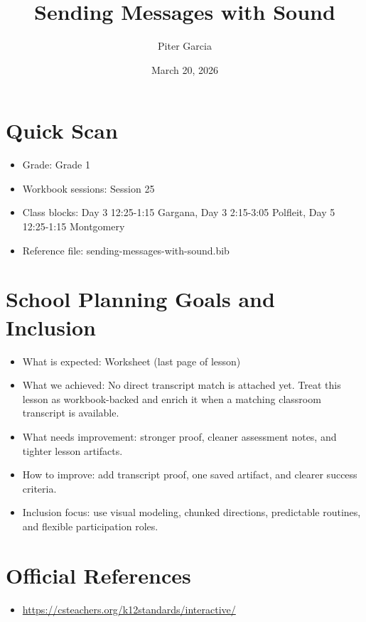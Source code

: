 \documentclass[11pt]{article}
\title{Sending Messages with Sound}
\author{Piter Garcia}
\date{March 20, 2026}
\begin{document}
\maketitle
\section*{Quick Scan}
\begin{itemize}[leftmargin=*]
\item Grade: Grade 1
\item Workbook sessions: Session 25
\item Class blocks: Day 3 12:25-1:15 Gargana, Day 3 2:15-3:05 Polfleit, Day 5 12:25-1:15 Montgomery
\item Reference file: sending-messages-with-sound.bib
\end{itemize}
\section*{School Planning Goals and Inclusion}
\begin{itemize}[leftmargin=*]
\item What is expected: Worksheet (last page of lesson)
\item What we achieved: No direct transcript match is attached yet. Treat this lesson as workbook-backed and enrich it when a matching classroom transcript is available.
\item What needs improvement: stronger proof, cleaner assessment notes, and tighter lesson artifacts.
\item How to improve: add transcript proof, one saved artifact, and clearer success criteria.
\item Inclusion focus: use visual modeling, chunked directions, predictable routines, and flexible participation roles.
\end{itemize}
\section*{Official References}
\begin{itemize}[leftmargin=*]
\item \url{https://csteachers.org/k12standards/interactive/}

\end{itemize}
\end{document}
